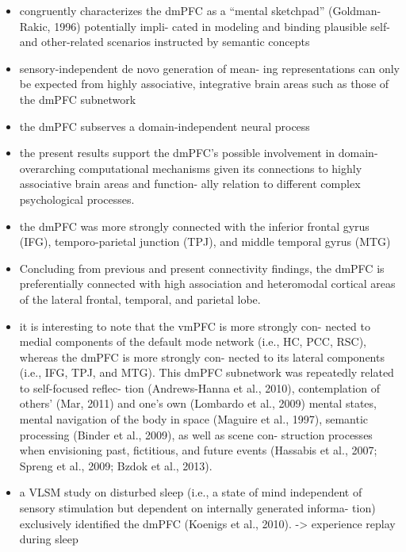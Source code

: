 \documentclass{article} %
\begin{document}
\begin{itemize}
\begin{itemize}
\item
congruently characterizes the dmPFC as a “mental sketchpad” (Goldman-Rakic, 1996) potentially impli- cated in modeling and binding plausible self- and other-related scenarios instructed by semantic concepts

\item
 sensory-independent de novo generation of mean- ing representations can only be expected from highly associative, integrative brain areas such as those of the dmPFC subnetwork

\item
the dmPFC subserves a domain-independent neural process

\item
the present results support the dmPFC’s possible involvement in domain-overarching computational mechanisms given its connections to highly associative brain areas and function- ally relation to different complex psychological processes.

\item
the dmPFC was more strongly connected with the inferior frontal gyrus (IFG), temporo-parietal junction (TPJ), and middle temporal gyrus (MTG)

\item
Concluding from previous and present connectivity findings, the dmPFC is preferentially connected with high association and heteromodal cortical areas of the lateral frontal, temporal, and parietal lobe.

\item
it is interesting to note that the vmPFC is more strongly con- nected to medial components of the default mode network (i.e., HC, PCC, RSC), whereas the dmPFC is more strongly con- nected to its lateral components (i.e., IFG, TPJ, and MTG). This dmPFC subnetwork was repeatedly related to self-focused reflec- tion (Andrews-Hanna et al., 2010), contemplation of others’ (Mar, 2011) and one’s own (Lombardo et al., 2009) mental states, mental navigation of the body in space (Maguire et al., 1997), semantic processing (Binder et al., 2009), as well as scene con- struction processes when envisioning past, fictitious, and future events (Hassabis et al., 2007; Spreng et al., 2009; Bzdok et al., 2013).


\item
a VLSM study on disturbed sleep (i.e., a state of mind independent of sensory stimulation but dependent on internally generated informa- tion) exclusively identified the dmPFC (Koenigs et al., 2010).
-> experience replay during sleep


\end{itemize}
\end{itemize}
\end{document}
